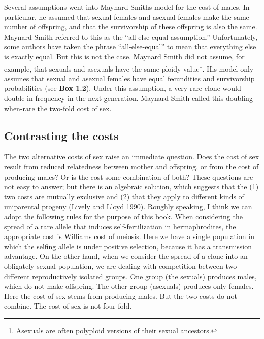 \documentclass[
  letterpaper,
]{book}
\begin{document}
Several assumptions went into Maynard Smith\textquotesingle s model for
the cost of males. In particular, he assumed that sexual females and
asexual females make the same number of offspring, and that the
survivorship of these offspring is also the same. Maynard Smith referred
to this as the ``all-else-equal assumption.'' Unfortunately, some
authors have taken the phrase ``all-else-equal'' to mean that everything
else is exactly equal. But this is not the case. Maynard Smith did not
assume, for example, that sexuals and asexuals have the same ploidy
value\footnote{Asexuals are often polyploid versions of their sexual
  ancestors.}. His model only assumes that sexual and asexual females
have equal fecundities and survivorship probabilities (see \textbf{Box
1.2}). Under this assumption, a very rare clone would double in
frequency in the next generation. Maynard Smith called this
doubling-when-rare the two-fold cost of sex.

\hypertarget{contrasting-the-costs}{%
\subsection{Contrasting the costs}\label{contrasting-the-costs}}

The two alternative costs of sex raise an immediate question. Does the
cost of sex result from reduced relatedness between mother and
offspring, or from the cost of producing males? Or is the cost some
combination of both? These questions are not easy to answer; but there
is an algebraic solution, which suggests that the (1) two costs are
mutually exclusive and (2) that they apply to different kinds of
uniparental progeny (Lively and Lloyd 1990). Roughly speaking, I think
we can adopt the following rules for the purpose of this book. When
considering the spread of a rare allele that induces self-fertilization
in hermaphrodites, the appropriate cost is Williams\textquotesingle{}
cost of meiosis. Here we have a single population in which the selfing
allele is under positive selection, because it has a transmission
advantage. On the other hand, when we consider the spread of a clone
into an obligately sexual population, we are dealing with competition
between two different reproductively isolated groups. One group (the
sexuals) produces males, which do not make offspring. The other group
(asexuals) produces only females. Here the cost of sex stems from
producing males. But the two costs do not combine. The cost of sex is
not four-fold.
\end{document}
